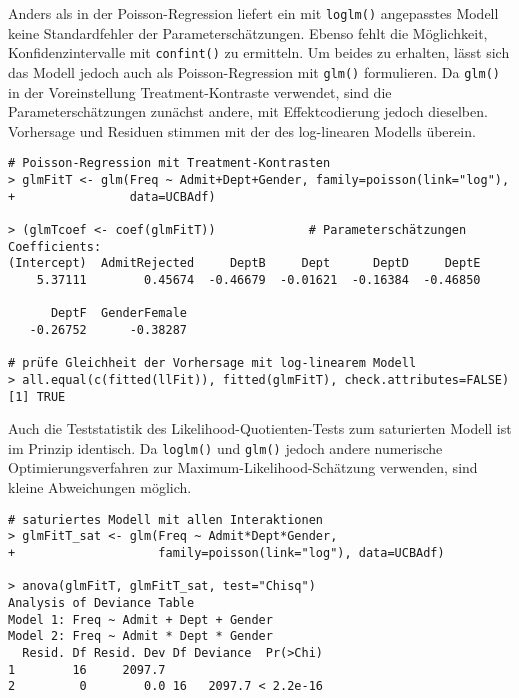 Anders als in der Poisson-Regression liefert ein mit \lstinline!loglm()! angepasstes Modell keine Standardfehler der Parameterschätzungen. Ebenso fehlt die Möglichkeit, Konfidenzintervalle mit \lstinline!confint()! zu ermitteln. Um beides zu erhalten, lässt sich das Modell jedoch auch als Poisson-Regression mit \lstinline!glm()! formulieren. Da \lstinline!glm()! in der Voreinstellung Treatment-Kontraste verwendet, sind die Parameterschätzungen zunächst andere, mit Effektcodierung jedoch dieselben. Vorhersage und Residuen stimmen mit der des log-linearen Modells überein.
\begin{lstlisting}
# Poisson-Regression mit Treatment-Kontrasten
> glmFitT <- glm(Freq ~ Admit+Dept+Gender, family=poisson(link="log"),
+                data=UCBAdf)

> (glmTcoef <- coef(glmFitT))             # Parameterschätzungen
Coefficients:
(Intercept)  AdmitRejected     DeptB     Dept      DeptD     DeptE
    5.37111        0.45674  -0.46679  -0.01621  -0.16384  -0.46850

      DeptF  GenderFemale
   -0.26752      -0.38287

# prüfe Gleichheit der Vorhersage mit log-linearem Modell
> all.equal(c(fitted(llFit)), fitted(glmFitT), check.attributes=FALSE)
[1] TRUE
\end{lstlisting}

Auch die Teststatistik des Likelihood-Quotienten-Tests zum saturierten Modell ist im Prinzip identisch. Da \lstinline!loglm()! und \lstinline!glm()! jedoch andere numerische Optimierungsverfahren zur Maximum-Likelihood-Schätzung verwenden, sind kleine Abweichungen möglich.
\begin{lstlisting}
# saturiertes Modell mit allen Interaktionen
> glmFitT_sat <- glm(Freq ~ Admit*Dept*Gender,
+                    family=poisson(link="log"), data=UCBAdf)

> anova(glmFitT, glmFitT_sat, test="Chisq")
Analysis of Deviance Table
Model 1: Freq ~ Admit + Dept + Gender
Model 2: Freq ~ Admit * Dept * Gender
  Resid. Df Resid. Dev Df Deviance  Pr(>Chi)    
1        16     2097.7                          
2         0        0.0 16   2097.7 < 2.2e-16
\end{lstlisting}

